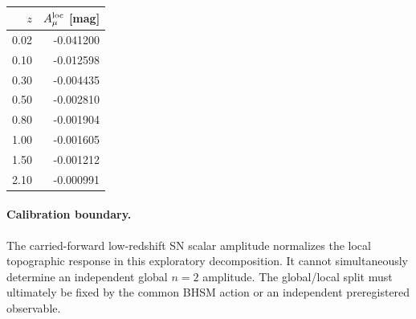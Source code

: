 \begin{center}
\begin{tabular}{r r}
$z$ & $A_\mu^{\rm loc}$ [mag]\\
\hline
0.02 & -0.041200\\
0.10 & -0.012598\\
0.30 & -0.004435\\
0.50 & -0.002810\\
0.80 & -0.001904\\
1.00 & -0.001605\\
1.50 & -0.001212\\
2.10 & -0.000991\\
\end{tabular}
\end{center}

\paragraph{Calibration boundary.}
The carried-forward low-redshift SN scalar amplitude normalizes the local topographic response in this exploratory decomposition.  It cannot simultaneously determine an independent global $n=2$ amplitude.  The global/local split must ultimately be fixed by the common BHSM action or an independent preregistered observable.

